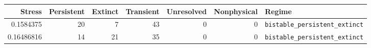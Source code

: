 \begin{tabular}{rrrrrrl}
\toprule
Stress & Persistent & Extinct & Transient & Unresolved & Nonphysical & Regime \\
\midrule
0.1584375 & 20 & 7 & 43 & 0 & 0 & \texttt{bistable\_persistent\_extinct} \\
0.16486816 & 14 & 21 & 35 & 0 & 0 & \texttt{bistable\_persistent\_extinct} \\
\bottomrule
\end{tabular}
